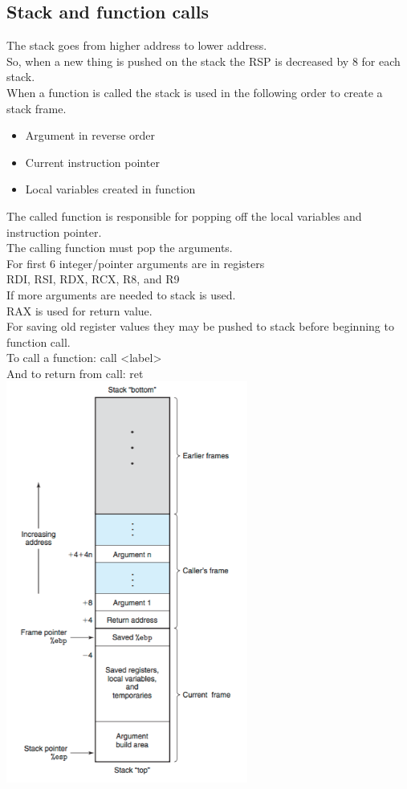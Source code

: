 \documentclass[12pt, a4paper]{article}
\begin{document}
		\subsection{Stack and function calls}
			The stack goes from higher address to lower address.\\
			So, when a new thing is pushed on the stack the RSP is decreased by 8 for each stack.\\
			When a function is called the stack is used in the following order to create a stack frame.
			\begin{itemize}
				\item Argument in reverse order
				\item Current instruction pointer 
				\item Local variables created in function
			\end{itemize}
			The called function is responsible for popping off the local variables and instruction pointer.\\
			The calling function must pop the arguments.\\
			For first 6 integer/pointer arguments are in registers\\
			RDI, RSI, RDX, RCX, R8, and R9\\
			If more arguments are needed to stack is used.\\
			RAX is used for return value.\\
			For saving old register values they may be pushed to stack before beginning to function call.\\
			To call a function: call <label>\\
			And to return from call: ret\\
			\includegraphics[width=300px]{assets/stackFrameStructure.png}
\end{document}
